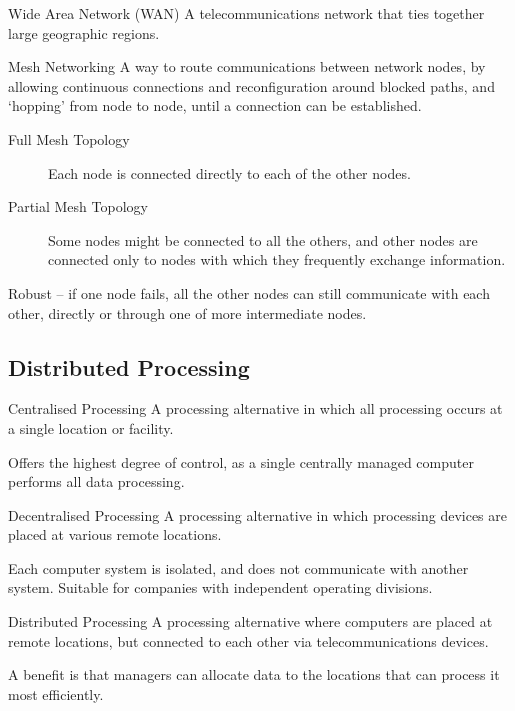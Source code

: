\documentclass[\main/notes.tex]{subfiles}
\begin{document}
				\begin{definition}{Wide Area Network (WAN)}
					A telecommunications network that ties together large geographic regions.
				\end{definition}
				\begin{definition}{Mesh Networking}
					A way to route communications between network nodes, by allowing continuous connections and reconfiguration around blocked paths, and `hopping' from node to node, until a connection can be established.
					\begin{description}
						\item[Full Mesh Topology] Each node is connected directly to each of the other nodes.
						\item[Partial Mesh Topology] Some nodes might be connected to all the others, and other nodes are connected only to nodes with which they frequently exchange information.
					\end{description}
					Robust -- if one node fails, all the other nodes can still communicate with each other, directly or through one of more intermediate nodes.
				\end{definition}
			\subsection{Distributed Processing}
				\begin{definition}{Centralised Processing}
					A processing alternative in which all processing occurs at a single location or facility.

					Offers the highest degree of control, as a single centrally managed computer performs all data processing.
				\end{definition}
				\pagebreak
				\begin{definition}{Decentralised Processing}
					A processing alternative in which processing devices are placed at various remote locations.

					Each computer system is isolated, and does not communicate with another system. Suitable for companies with independent operating divisions.
				\end{definition}
				\begin{definition}{Distributed Processing}
					A processing alternative where computers are placed at remote locations, but connected to each other via telecommunications devices.

					A benefit is that managers can allocate data to the locations that can process it most efficiently.
				\end{definition}
\end{document}

